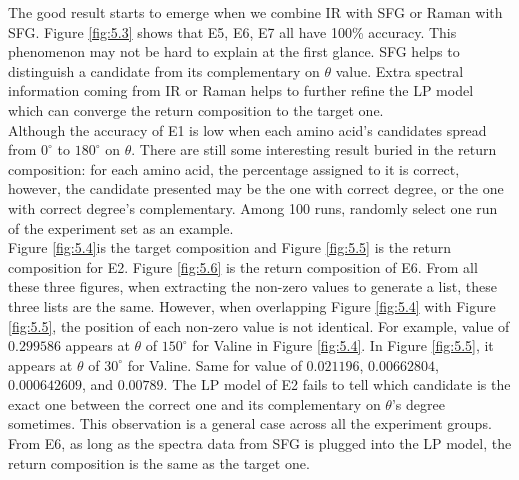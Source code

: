 The good result starts to emerge when we combine IR with SFG or Raman with SFG. Figure \ref{fig:5.3} shows that E5, E6, E7 all have 100\% accuracy. This phenomenon may not be hard to explain at the first glance. SFG helps to distinguish a candidate from its complementary on $\theta$ value. Extra spectral information coming from IR or Raman helps to further refine the LP model which can converge the return composition to the target one. \\
Although the accuracy of E1 is low when each amino acid's candidates spread from $0^{\circ}$ to $180^{\circ}$ on $\theta$. There are still some interesting result buried in the return composition: for each amino acid, the percentage assigned to it is correct, however, the candidate presented may be the one with correct degree, or the one with correct degree's complementary. Among 100 runs, randomly select one run of the experiment set as an example. \\
  
Figure \ref{fig:5.4}is the target composition and Figure \ref{fig:5.5} is the return composition for E2. Figure \ref{fig:5.6} is the return composition of E6. From all these three figures, when extracting the non-zero values to generate a list, these three lists are the same. However, when overlapping Figure \ref{fig:5.4} with Figure  \ref{fig:5.5}, the position of each non-zero value is not identical. For example, value of $0.299586$ appears at $\theta$ of $150^{\circ}$ for Valine in Figure \ref{fig:5.4}. In Figure \ref{fig:5.5}, it appears at $\theta$ of $30^{\circ}$ for Valine. Same for value of $0.021196$, $0.00662804$, $0.000642609$, and $0.00789$. The LP model of E2 fails to tell which candidate is the exact one between the correct one and its complementary on $\theta$'s degree sometimes. This observation is a general case across all the experiment groups. From E6, as long as the spectra data from SFG is plugged into the LP model, the return composition is the same as the target one. \\


